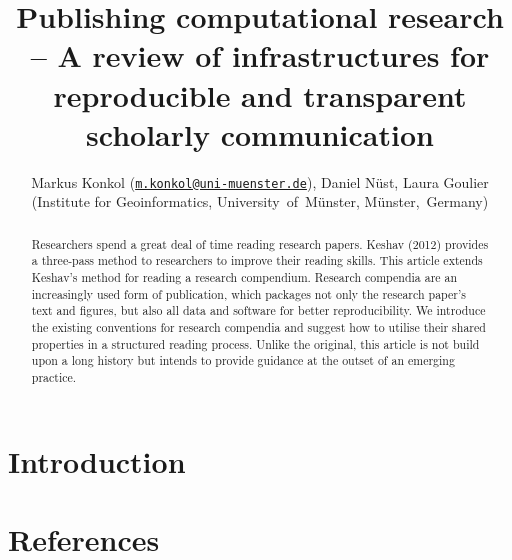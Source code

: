 \documentclass[twocolumn]{article}
\title{Publishing computational research -- A review of infrastructures for
reproducible and transparent scholarly communication}
\author{Markus Konkol
(\href{mailto:m.konkol@uni-muenster.de}{\nolinkurl{m.konkol@uni-muenster.de}}),
Daniel Nüst, Laura Goulier (Institute for Geoinformatics,
University~of~Münster, Münster,~Germany)}
\date{}
\begin{document}
\maketitle
\begin{abstract}
Researchers spend a great deal of time reading research papers. Keshav
(2012) provides a three-pass method to researchers to improve their
reading skills. This article extends Keshav's method for reading a
research compendium. Research compendia are an increasingly used form of
publication, which packages not only the research paper's text and
figures, but also all data and software for better reproducibility. We
introduce the existing conventions for research compendia and suggest
how to utilise their shared properties in a structured reading process.
Unlike the original, this article is not build upon a long history but
intends to provide guidance at the outset of an emerging practice.
\end{abstract}

\hypertarget{introduction}{%
\section{Introduction}\label{introduction}}

\hypertarget{references}{%
\section*{References}\label{references}}
\end{document}
